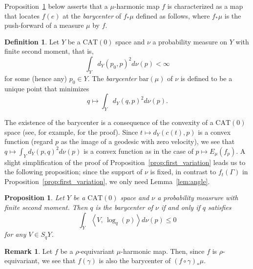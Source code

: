 \documentclass[12pt]{amsart}
\numberwithin{equation}{section}
\theoremstyle{plain}
\newtheorem{Proposition}[Theorem]{Proposition}
\theoremstyle{definition}
\newtheorem{Definition}[Theorem]{Definition}
\newtheorem{Remark}[Theorem]{Remark}
\theoremstyle{remark}
\newcommand{\tcprj}{\log}
\newcommand{\ene}[1]{E_{#1}}
\newcommand{\inner}[2]{\left\langle #1,\, #2 \right\rangle}
\newcommand{\cat}[1]{\mathrm{CAT}(#1)}
\newcommand{\bary}[1]{\mathrm{bar}(#1)}
\begin{document}
Proposition~\ref{prop:barycenter} below asserts that a
$\mu$-harmonic map $f$ is characterized as a map that locates $f(e)$ at
the {\it barycenter} of $f_* \mu$ defined as follows, where $f_*\mu$ is
the push-forward of a measure $\mu$ by $f$. 

\begin{Definition}
 \label{defn:barycenter}
 Let $Y$ be a $\cat{0}$ space and $\nu$ a probability measure on $Y$
 with finite second moment, that is, 
\begin{equation*}
 \int_Y d_Y(p_0, p)^2 d\nu(p) < \infty
\end{equation*}
 for some (hence any) $p_0 \in Y$.  The {\it barycenter} $\bary{\mu}$ of
 $\nu$ is defined to be a unique point that minimizes
\begin{equation*}
 q \mapsto \int_Y d_Y(q, p)^2 d\nu(p). 
\end{equation*}
\end{Definition}

 The existence of the barycenter is a consequence of the convexity of a
 $\cat{0}$ space
 (see, for example,  \cite[Lemma 2.5.1]{korevaar-schoen1} for the
 proof). 
 Since $t \mapsto d_Y(c(t),p)$ is a convex function (regard $p$ as the
 image of a geodesic with zero velocity),  we see that
 $q \mapsto \int_Y d_Y(p,q)^2d\nu(p)$ is a convex function as in the
 case of $p \mapsto \ene{\mu}(f_p)$. 
 A slight simplification of the proof of
 Proposition~\ref{prop:first_variation} leads us to the following
 proposition;  since the support of $\nu$ is fixed, in contrast to
 $f_t(\Gamma)$ in Proposition~\ref{prop:first_variation}, we only need 
 Lemma~\ref{lem:angle}. 

\begin{Proposition}
 \label{prop:barycenter}
 Let $Y$ be a $\cat{0}$ space and $\nu$ a probability measrure with
 finite second moment. Then $q$ is the barycenter of $\nu$ 
 if and only if $q$ satisfies
\begin{equation*}
 \int_{Y}\inner{V}{\tcprj_q(p)} d\nu(p) \leq 0
\end{equation*}
 for any $V \in S_qY$. 
\end{Proposition}

\begin{Remark}
\label{rem:barycenter}
 Let $f$ be a $\rho$-equivariant $\mu$-harmonic map. 
 Then, since $f$ is $\rho$-equivariant, we see that $f(\gamma)$
 is also the barycenter of $(f\circ \gamma)_* \mu$. 
\end{Remark}
\end{document}
